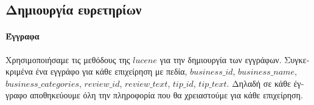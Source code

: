 

\lstset{style=mystyle}

\subsection{\textgreek{Δημιουργία ευρετηρίων}}
\paragraph{\textgreek{Έγγραφα}}\textgreek{
Χρησιμοποιήσαμε τις μεθόδους της $lucene$ για την δημιουργία των εγγράφων.
Συγκεκριμένα ένα εγγράφο για κάθε επιχείρηση με πεδία, $business\_id$, $business\_name$, $business\_categories$,
$review\_id$, $review\_text$, $tip\_id$, $tip\_text$.
Δηλαδή σε κάθε έγγραφο αποθηκεύουμε όλη την πληροφορία που θα χρειαστούμε για κάθε επιχείρηση.
}

